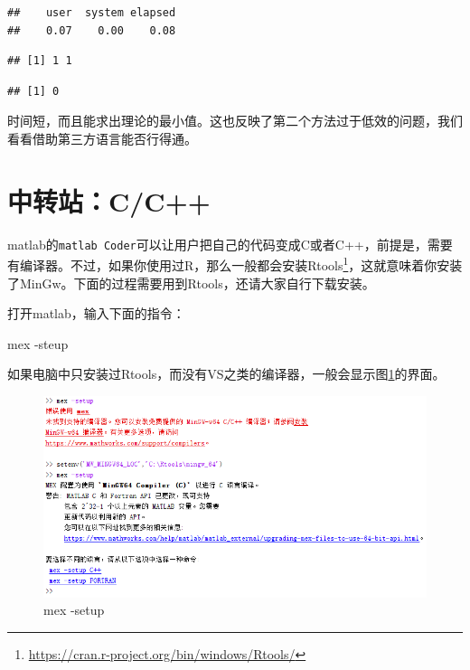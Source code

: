 \documentclass[]{ctexbook}
\newenvironment{Shaded}{\begin{snugshade}}{\end{snugshade}}
\newcommand{\OperatorTok}[1]{\textcolor[rgb]{0.81,0.36,0.00}{\textbf{#1}}}
\newcommand{\NormalTok}[1]{#1}
\renewcommand{\href}[2]{#2\footnote{\url{#1}}}
\theoremstyle{definition}
\theoremstyle{definition}
\theoremstyle{definition}
\theoremstyle{remark}
\begin{document}
\begin{verbatim}
##    user  system elapsed 
##    0.07    0.00    0.08
\end{verbatim}

\begin{Shaded}
\end{Shaded}

\begin{verbatim}
## [1] 1 1
\end{verbatim}

\begin{Shaded}
\end{Shaded}

\begin{verbatim}
## [1] 0
\end{verbatim}

时间短，而且能求出理论的最小值。这也反映了第二个方法过于低效的问题，我们看看借助第三方语言能否行得通。

\section{中转站：C/C++}\label{cc}

matlab的\texttt{matlab\ Coder}可以让用户把自己的代码变成C或者C++，前提是，需要有编译器。不过，如果你使用过R，那么一般都会安装\href{https://cran.r-project.org/bin/windows/Rtools/}{Rtools}，这就意味着你安装了MinGw。下面的过程需要用到Rtools，还请大家自行下载安装。

打开matlab，输入下面的指令：

\begin{Shaded}
\begin{Highlighting}[]
\NormalTok{mex -steup}
\end{Highlighting}
\end{Shaded}

如果电脑中只安装过Rtools，而没有VS之类的编译器，一般会显示图\ref{fig:mex}的界面。

\begin{figure}

{\centering \includegraphics[width=0.95\linewidth]{img/mex} 

}

\caption{mex -setup}\label{fig:mex}
\end{figure}
\end{document}
